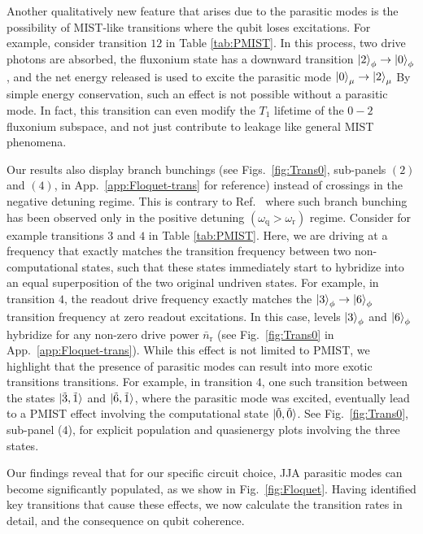 \documentclass[%
reprint,
superscriptaddress,
 amsmath,amssymb,
 aps,
 prx,
longbibliography,
floatfix,
]{revtex4-2}
\begin{document}
Another qualitatively new feature that arises due to the parasitic modes is the possibility of MIST-like transitions where the qubit loses excitations.  For example, consider transition $12$ in Table \ref{tab:PMIST}. In this process, two drive photons are absorbed, the fluxonium state has a downward transition $\ket{2}_\phi\rightarrow\ket{0}_\phi$, and the net energy released is used to excite the parasitic mode $\ket{0}_\mu\rightarrow \ket{2}_\mu$ By simple energy conservation, such an effect is not possible without a parasitic mode. In fact, this transition can even modify the $T_1$ lifetime of the $0-2$ fluxonium subspace, and not just contribute to leakage like general MIST phenomena.

Our results also display branch bunchings (see Figs.~\ref{fig:Trans0}, sub-panels $(2)$ and $(4)$, in App.~\ref{app:Floquet-trans} for reference) instead of crossings in the negative detuning regime. This is contrary to Ref.~\cite{dumas2024unified} where such branch bunching has been observed only in the positive detuning $(\omega_\textrm{q}>\omega_\textrm{r})$ regime.  Consider for example transitions $3$ and $4$ in Table \ref{tab:PMIST}. Here, we are  driving at a frequency that exactly matches the transition frequency between two non-computational states, such that these states immediately start to hybridize into an equal superposition of the two 
original undriven states.  For example, in transition $4$, the readout drive frequency exactly matches the $\ket{3}_\phi \rightarrow \ket{6}_\phi$ transition frequency at zero readout excitations. In this case, levels $\ket{3}_\phi$ and $\ket{6}_\phi$ hybridize for any non-zero drive power $\bar n_\textrm{r}$  (see Fig.~\ref{fig:Trans0} in App.~\ref{app:Floquet-trans}). While this effect is not limited to PMIST, we highlight that the presence of parasitic modes can result into more exotic transitions transitions. For example, in transition  $4$, one such transition between the states $\ket{\tilde{3},\tilde{1}}$ and $\ket{\tilde{6},\tilde{1}}$, where the parasitic mode was excited, eventually lead to a PMIST effect involving the computational state $\ket{\tilde{0},\tilde{0}}$. See Fig.~\ref{fig:Trans0}, sub-panel ($4$), for explicit population and quasienergy plots involving the three states.



Our findings reveal that for our specific circuit choice, JJA parasitic modes can become significantly populated, as we show in Fig.~\ref{fig:Floquet}. Having identified key transitions that cause these effects, we now calculate the transition rates in detail, and the consequence on qubit coherence. 
\end{document}
